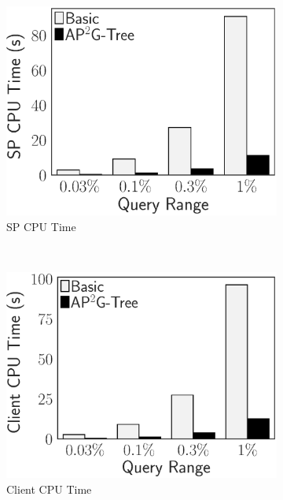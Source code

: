 \begin{figure}[t]
    \centering
    \begin{subfigure}{.33\linewidth}
        \includegraphics[height=\ht\figbox]{exp-figs/access-control/join_sp.eps}
        \caption{SP CPU Time}
    \end{subfigure}~%
    \begin{subfigure}{.33\linewidth}
        \includegraphics[height=\ht\figbox]{exp-figs/access-control/join_user.eps}
        \caption{Client CPU Time}
    \end{subfigure}~%
    \begin{subfigure}{.33\linewidth}

\end{subfigure}
\end{figure}
